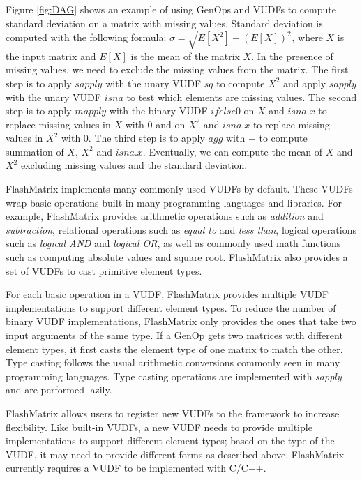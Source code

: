 Figure \ref{fig:DAG} shows an example of using GenOps and VUDFs to compute
standard deviation on a matrix with missing values. Standard deviation is
computed with the following
formula: $\sigma = \sqrt{E[X^2] - (E[X])^2}$, where $X$ is the input matrix and
$E[X]$ is the mean of the matrix $X$. In the presence of missing values, we
need to exclude the missing values from the matrix. The first step is to apply
$sapply$ with the unary VUDF $sq$ to compute $X^2$ and apply $sapply$ with
the unary VUDF $isna$ to test which elements are missing values. The second
step is to apply $mapply$ with the binary VUDF $ifelse0$ on $X$ and $isna.x$
to replace missing
values in $X$ with 0 and on $X^2$ and $isna.x$ to replace missing values in
$X^2$ with 0. The third step is to apply $agg$ with $+$ to compute summation
of $X$, $X^2$ and $isna.x$. Eventually, we can compute the mean of $X$ and
$X^2$ excluding missing values and the standard deviation.

FlashMatrix implements many commonly used VUDFs by default. These VUDFs wrap
basic operations built in many programming languages and libraries. For example,
FlashMatrix provides arithmetic operations such as \textit{addition} and
\textit{subtraction}, relational operations such as \textit{equal to} and
\textit{less than}, logical operations such as \textit{logical AND} and
\textit{logical OR}, as well as commonly used math functions such as computing
absolute values and square root. FlashMatrix also provides a set of VUDFs to
cast primitive element types.

For each basic operation in a VUDF, FlashMatrix provides multiple VUDF
implementations to support different element types. To reduce the number
of binary VUDF implementations, FlashMatrix only provides the ones that take
two input arguments of the same type. If a GenOp gets two matrices with different
element types, it first casts the element type of one matrix to match
the other. Type casting follows the usual arithmetic conversions \cite{}
commonly seen in many programming languages. Type casting operations are
implemented with \textit{sapply} and are performed lazily.

FlashMatrix allows users to register new VUDFs to the framework to increase
flexibility. Like built-in VUDFs, a new VUDF needs to provide multiple
implementations to support different element types; based on the type of
the VUDF, it may need to provide different forms as described above.
FlashMatrix currently requires a VUDF to be implemented with C/C++.

